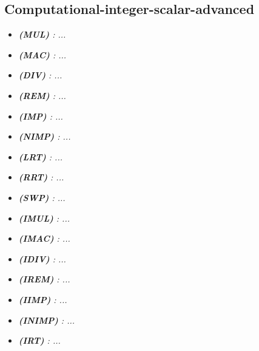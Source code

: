     \subsection{Computational-integer-scalar-advanced}

        \begin{multicols}{2}

            \begin{itemize}

                \item \textit{\textbf{(MUL) }: ...}

                \item \textit{\textbf{(MAC) }: ...}

                \item \textit{\textbf{(DIV) }: ...}
                
                \item \textit{\textbf{(REM) }: ...}

                \item \textit{\textbf{(IMP) }: ...}

                \item \textit{\textbf{(NIMP) }: ...}

                \item \textit{\textbf{(LRT) }: ...}
                
                \item \textit{\textbf{(RRT) }: ...}

                \item \textit{\textbf{(SWP) }: ...}

                \item \textit{\textbf{(IMUL) }: ...}

                \item \textit{\textbf{(IMAC) }: ...}
                
                \item \textit{\textbf{(IDIV) }: ...}

                \item \textit{\textbf{(IREM) }: ...}

                \item \textit{\textbf{(IIMP) }: ...}

                \item \textit{\textbf{(INIMP) }: ...}
                
                \item \textit{\textbf{(IRT) }: ...}


\end{itemize}
\end{multicols}
